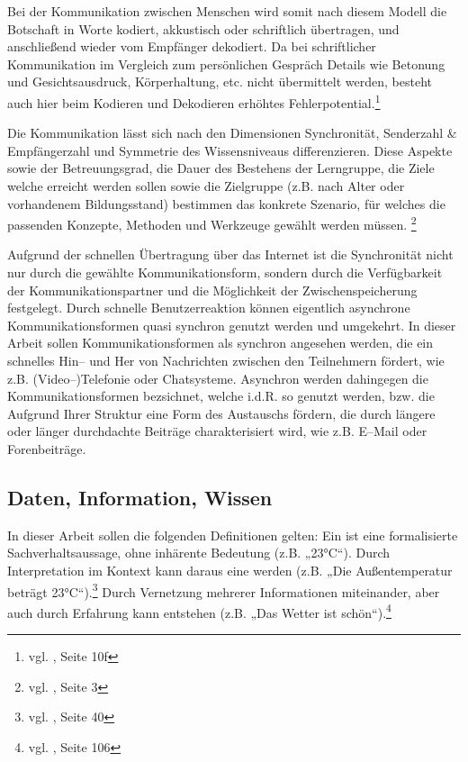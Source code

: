 Bei der Kommunikation zwischen Menschen wird somit nach diesem Modell die Botschaft in Worte kodiert, akkustisch oder schriftlich übertragen, und anschließend wieder vom Empfänger dekodiert. Da bei schriftlicher Kommunikation im Vergleich zum persönlichen Gespräch Details wie Betonung und Gesichtsausdruck, Körperhaltung, etc. nicht übermittelt werden, besteht auch hier beim Kodieren und Dekodieren erhöhtes Fehlerpotential.\footnote{vgl. \cite{rothe}, Seite 10f}

Die Kommunikation lässt sich nach den Dimensionen Synchronität, Senderzahl \& Empfängerzahl und Symmetrie des Wissensniveaus differenzieren. Diese Aspekte sowie der Betreuungsgrad, die Dauer des Bestehens der Lerngruppe, die Ziele welche erreicht werden sollen sowie die Zielgruppe (z.B. nach Alter oder vorhandenem Bildungsstand) bestimmen das konkrete Szenario, für welches die passenden Konzepte, Methoden und Werkzeuge gewählt werden müssen. \footnote{vgl. \cite{csclcomp}, Seite 3}

Aufgrund der schnellen Übertragung über das Internet ist die Synchronität nicht nur durch die gewählte Kommunikationsform, sondern durch die Verfügbarkeit der Kommunikationspartner und die Möglichkeit der  Zwischenspeicherung festgelegt. Durch schnelle Benutzerreaktion können eigentlich asynchrone Kommunikationsformen quasi synchron genutzt werden und umgekehrt. In dieser Arbeit sollen Kommunikationsformen als synchron angesehen werden, die ein schnelles Hin-- und Her von Nachrichten zwischen den Teilnehmern fördert, wie z.B. (Video--)Telefonie oder Chatsysteme. Asynchron werden dahingegen die Kommunikationsformen bezsichnet, welche i.d.R. so genutzt werden, bzw. die Aufgrund Ihrer Struktur eine Form des Austauschs fördern, die durch längere oder länger durchdachte Beiträge charakterisiert wird, wie z.B. E--Mail oder Forenbeiträge.


\subsection{Daten, Information, Wissen}
\label{sub:defwissen}

In dieser Arbeit sollen die folgenden Definitionen gelten: Ein  ist eine formalisierte Sachverhaltsaussage, ohne inhärente Bedeutung (z.B. „23°C“). Durch Interpretation im Kontext kann daraus eine  werden (z.B. „Die Außentemperatur beträgt 23°C“).\footnote{vgl. \cite{kfk}, Seite 40} Durch Vernetzung mehrerer Informationen miteinander, aber auch durch Erfahrung kann  entstehen (z.B. „Das Wetter ist schön“).\footnote{vgl. \cite{pnik}, Seite 106}

